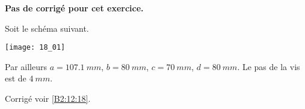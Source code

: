 \normalfalse \difficilefalse \tdifficiletrue
\correctionfalse


\setcounter{question}{0}
\ifcorrection
\else
\textbf{Pas de corrigé pour cet exercice.}
\fi

\ifprof
\else

Soit le schéma suivant. 
\begin{center}
\texttt{[image: 18\_01]}
\end{center}
\fi

Par ailleurs $a=\SI{107,1}{mm}$, $b=\SI{80}{mm}$, $c=\SI{70}{mm}$, $d=\SI{80}{mm}$. Le pas de la vis est de $\SI{4}{mm}$.


\ifprof
\else
\fi

\ifprof
\else
\fi

\ifprof
\else
\fi


\ifprof
\else
\fi



\ifprof
\else
\begin{flushright}
\footnotesize{Corrigé  voir \ref{B2:12:18}.}
\end{flushright}%
\fi